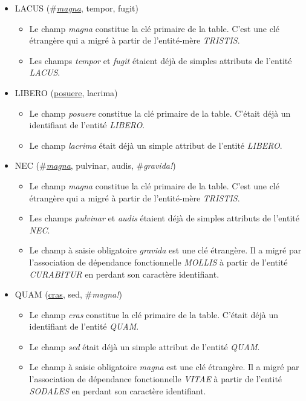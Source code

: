 \documentclass[a4paper]{article}
\newcommand{\relat}[1]{\textsc{#1}}
\newcommand{\attr}[1]{#1}
\newcommand{\prim}[1]{\uline{#1}}
\newcommand{\foreign}[1]{\#\textsl{#1}}
\begin{document}
\begin{itemize}
  \item \relat{LACUS} (\foreign{\prim{magna}}, \attr{tempor}, \attr{fugit})
  \begin{itemize}
    \item Le champ \emph{magna} constitue la clé primaire de la table. C'est une clé étrangère qui a migré à partir de l'entité-mère \emph{TRISTIS}.
    \item Les champs \emph{tempor} et \emph{fugit} étaient déjà de simples attributs de l'entité \emph{LACUS}.
  \end{itemize}

  \item \relat{LIBERO} (\prim{posuere}, \attr{lacrima})
  \begin{itemize}
    \item Le champ \emph{posuere} constitue la clé primaire de la table. C'était déjà un identifiant de l'entité \emph{LIBERO}.
    \item Le champ \emph{lacrima} était déjà un simple attribut de l'entité \emph{LIBERO}.
  \end{itemize}

  \item \relat{NEC} (\foreign{\prim{magna}}, \attr{pulvinar}, \attr{audis}, \foreign{gravida!})
  \begin{itemize}
    \item Le champ \emph{magna} constitue la clé primaire de la table. C'est une clé étrangère qui a migré à partir de l'entité-mère \emph{TRISTIS}.
    \item Les champs \emph{pulvinar} et \emph{audis} étaient déjà de simples attributs de l'entité \emph{NEC}.
    \item Le champ à saisie obligatoire \emph{gravida} est une clé étrangère. Il a migré par l'association de dépendance fonctionnelle \emph{MOLLIS} à partir de l'entité \emph{CURABITUR} en perdant son caractère identifiant.
  \end{itemize}

  \item \relat{QUAM} (\prim{cras}, \attr{sed}, \foreign{magna!})
  \begin{itemize}
    \item Le champ \emph{cras} constitue la clé primaire de la table. C'était déjà un identifiant de l'entité \emph{QUAM}.
    \item Le champ \emph{sed} était déjà un simple attribut de l'entité \emph{QUAM}.
    \item Le champ à saisie obligatoire \emph{magna} est une clé étrangère. Il a migré par l'association de dépendance fonctionnelle \emph{VITAE} à partir de l'entité \emph{SODALES} en perdant son caractère identifiant.
  \end{itemize}


\end{itemize}
\end{document}

